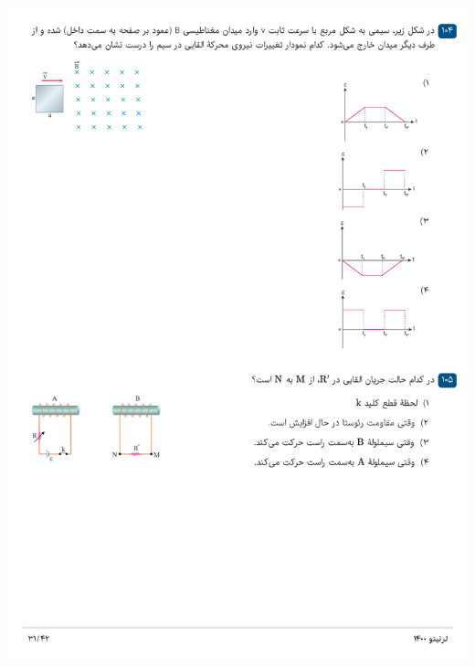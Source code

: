 \documentclass{book}
\begin{document}
\includegraphics[width=\textwidth]{"pages/31"}
\end{document}
